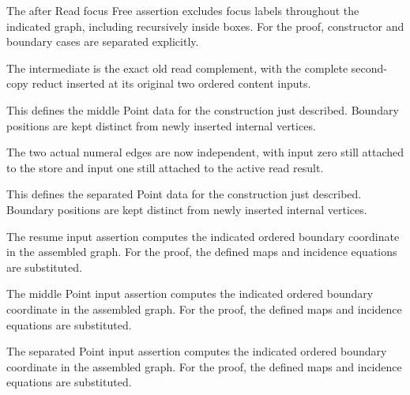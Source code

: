 The after Read focus Free assertion excludes focus labels throughout the indicated graph, including recursively inside boxes.
For the proof, constructor and boundary cases are separated explicitly.
\par{}

The intermediate is the exact old read complement, with the complete second-copy reduct inserted at its original two ordered content inputs.
\par{}

This defines the middle Point data for the construction just described. Boundary positions are kept distinct from newly inserted internal vertices.
\par{}

The two actual numeral edges are now independent, with input zero still attached to the store and input one still attached to the active read result.
\par{}

This defines the separated Point data for the construction just described. Boundary positions are kept distinct from newly inserted internal vertices.
\par{}

The resume input assertion computes the indicated ordered boundary coordinate in the assembled graph.
For the proof, the defined maps and incidence equations are substituted.
\par{}

The middle Point input assertion computes the indicated ordered boundary coordinate in the assembled graph.
For the proof, the defined maps and incidence equations are substituted.
\par{}

The separated Point input assertion computes the indicated ordered boundary coordinate in the assembled graph.
For the proof, the defined maps and incidence equations are substituted.
\par{}

